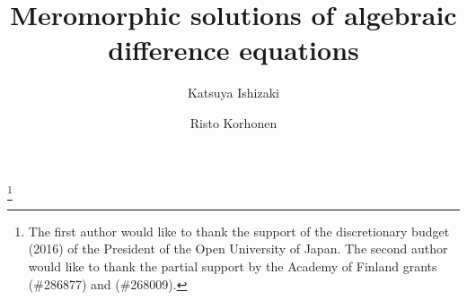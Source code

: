 \documentclass{amsart}
\begin{document}
\title{Meromorphic solutions of algebraic difference equations}

\thanks{The first author would like to thank the support of the discretionary budget (2016) of the President of the Open University of Japan.
The second author would like to thank the partial support by the Academy of Finland grants (\#286877) and (\#268009).}





\author{Katsuya Ishizaki \and Risto Korhonen}





\maketitle
\end{document}
